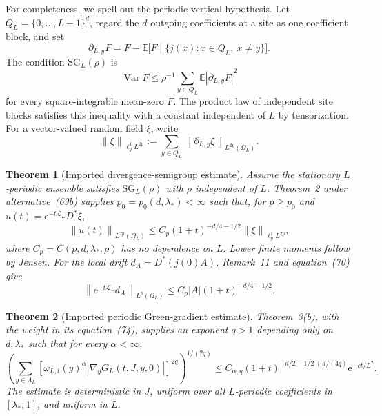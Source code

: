 \documentclass[11pt]{article}
\newtheorem{theorem}{Theorem}[section]
\theoremstyle{definition}
\theoremstyle{remark}
\newcommand{\e}{\mathrm e}
\newcommand{\E}{\mathbb E}
\newcommand{\Var}{\operatorname{Var}}
\newcommand{\norm}[1]{\left\lVert #1\right\rVert}
\newcommand{\abs}[1]{\left\lvert #1\right\rvert}
\begin{document}
For completeness, we spell out the periodic vertical hypothesis.  Let $Q_L=\{0,\ldots,L-1\}^d$, regard the $d$ outgoing coefficients at a site as one coefficient block, and set
\begin{equation}
 \partial_{L,y}F
 =F-\E\bigl[F\mid\{j(x):x\in Q_L,\ x\ne y\}\bigr].
 \label{eq:periodic-vertical-derivative}
\end{equation}
The condition $\mathrm{SG}_L(\rho)$ is
\begin{equation}
 \Var F\le\rho^{-1}\sum_{y\in Q_L}\E\abs{\partial_{L,y}F}^2
 \label{eq:periodic-SG-definition}
\end{equation}
for every square-integrable mean-zero $F$.  The product law of independent site blocks satisfies this inequality with a constant independent of $L$ by tensorization.  For a vector-valued random field $\xi$, write
\begin{equation}
 \norm{\xi}_{\ell_y^1L^{2p}}
 :=\sum_{y\in Q_L}\norm{\partial_{L,y}\xi}_{L^{2p}(\Omega_L)}.
 \label{eq:vertical-source-norm}
\end{equation}

\begin{theorem}[Imported divergence-semigroup estimate]
\label{thm:GNO-divergence-import}
Assume the stationary $L$-periodic ensemble satisfies $\mathrm{SG}_L(\rho)$ with $\rho$ independent of $L$.  Theorem~2 under alternative~(69b) supplies $p_0=p_0(d,\lambda_*)<\infty$ such that, for $p\ge p_0$ and $u(t)=\e^{-t\mathscr L_L}D^*\xi$,
\begin{equation}
 \norm{u(t)}_{L^{2p}(\Omega_L)}
 \le C_p(1+t)^{-d/4-1/2}\norm{\xi}_{\ell_y^1L^{2p}},
 \label{eq:GNO-Theorem2-specialized}
\end{equation}
where $C_p=C(p,d,\lambda_*,\rho)$ has no dependence on $L$.  Lower finite moments follow by Jensen.  For the local drift $d_A=D^*(j(0)A)$, Remark~11 and equation~(70) give
\begin{equation}
 \norm{\e^{-t\mathscr L_L}d_A}_{L^p(\Omega_L)}
 \le C_p\abs A(1+t)^{-d/4-1/2}.
 \label{eq:GNO-drift-moment}
\end{equation}
\end{theorem}

\begin{theorem}[Imported periodic Green-gradient estimate]
\label{thm:GNO-Green-import}
Theorem~3(b), with the weight in its equation~(74), supplies an exponent $q>1$ depending only on $d,\lambda_*$ such that for every $\alpha<\infty$,
\begin{equation}
 \left(\sum_{y\in\Lambda_L}
 [\omega_{L,t}(y)^\alpha\abs{\nabla_yG_L(t,J,y,0)}]^{2q}\right)^{1/(2q)}
 \le C_{\alpha,q}(1+t)^{-d/2-1/2+d/(4q)}\e^{-c t/L^2}.
 \label{eq:GNO-Theorem3b-specialized}
\end{equation}
The estimate is deterministic in $J$, uniform over all $L$-periodic coefficients in $[\lambda_*,1]$, and uniform in $L$.
\end{theorem}
\end{document}

